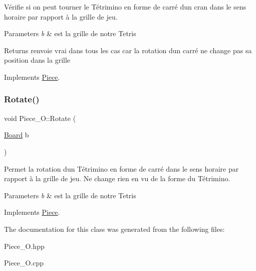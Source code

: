 Vérifie si on peut tourner le Tétrimino en forme de carré d\textquotesingle{}un cran dans le sens horaire par rapport à la grille de jeu. 


\begin{DoxyParams}{Parameters}
{\em b} & est la grille de notre Tetris \\
\hline
\end{DoxyParams}
\begin{DoxyReturn}{Returns}
renvoie vrai dans tous les cas car la rotation d\textquotesingle{}un carré ne change pas sa position dans la grille 
\end{DoxyReturn}


Implements \hyperlink{classPiece_a56cdf7f4234fe848a3e203b693b7a862}{Piece}.

\mbox{\label{classPiece__O_a69812f938582f176cd4cca997cbb87c1}} 
\subsubsection{\texorpdfstring{Rotate()}{Rotate()}}
{\footnotesize\ttfamily void Piece\+\_\+\+O\+::\+Rotate (\begin{DoxyParamCaption}\item[{\hyperlink{classBoard}{Board}}]{b }\end{DoxyParamCaption})\hspace{0.3cm}{\ttfamily [virtual]}}



Permet la rotation d\textquotesingle{}un Tétrimino en forme de carré dans le sens horaire par rapport à la grille de jeu. Ne change rien en vu de la forme du Tétrimino. 


\begin{DoxyParams}{Parameters}
{\em b} & est la grille de notre Tetris \\
\hline
\end{DoxyParams}


Implements \hyperlink{classPiece_a078f3cc6281cb8f60af3ae2266c651ba}{Piece}.



The documentation for this class was generated from the following files\+:\begin{DoxyCompactItemize}
\item 
Piece\+\_\+\+O.\+hpp\item 
Piece\+\_\+\+O.\+cpp\end{DoxyCompactItemize}
